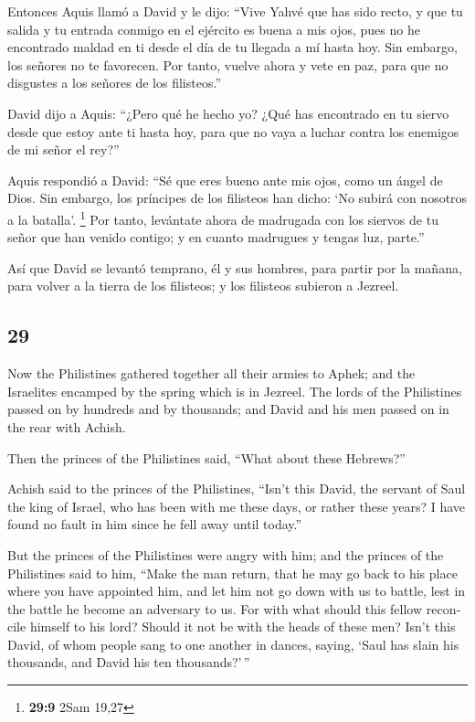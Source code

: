 \begin{paracol}{2}
 Entonces Aquis llamó a David y le dijo: ``Vive Yahvé que
has sido recto, y que tu salida y tu entrada conmigo en el ejército es
buena a mis ojos, pues no he encontrado maldad en ti desde el día de tu
llegada a mí hasta hoy. Sin embargo, los señores no te favorecen.
 Por tanto, vuelve ahora y vete en paz, para que no
disgustes a los señores de los filisteos.''

 David dijo a Aquis: ``¿Pero qué he hecho yo? ¿Qué has
encontrado en tu siervo desde que estoy ante ti hasta hoy, para que no
vaya a luchar contra los enemigos de mi señor el rey?''

 Aquis respondió a David: ``Sé que eres bueno ante mis
ojos, como un ángel de Dios. Sin embargo, los príncipes de los filisteos
han dicho: `No subirá con nosotros a la batalla'. \footnote{\textbf{29:9}
  2Sam 19,27}  Por tanto, levántate ahora de madrugada
con los siervos de tu señor que han venido contigo; y en cuanto
madrugues y tengas luz, parte.''

 Así que David se levantó temprano, él y sus hombres,
para partir por la mañana, para volver a la tierra de los filisteos; y
los filisteos subieron a Jezreel.

\switchcolumn
\begin{otherlanguage}{english}

\hypertarget{section-57}{%
\section{29}\label{section-57}}

 Now the Philistines gathered together all their armies to
Aphek; and the Israelites encamped by the spring which is in Jezreel.
 The lords of the Philistines passed on by hundreds and by
thousands; and David and his men passed on in the rear with Achish.

 Then the princes of the Philistines said, ``What about
these Hebrews?''

Achish said to the princes of the Philistines, ``Isn't this David, the
servant of Saul the king of Israel, who has been with me these days, or
rather these years? I have found no fault in him since he fell away
until today.''

 But the princes of the Philistines were angry with him;
and the princes of the Philistines said to him, ``Make the man return,
that he may go back to his place where you have appointed him, and let
him not go down with us to battle, lest in the battle he become an
adversary to us. For with what should this fellow reconcile himself to
his lord? Should it not be with the heads of these men? 
Isn't this David, of whom people sang to one another in dances, saying,
`Saul has slain his thousands, and David his ten thousands?'\,''


\end{otherlanguage}
\end{paracol}
